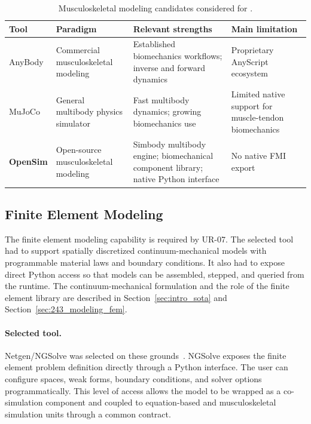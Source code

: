 \begin{table}[htbp]
  \centering
  \small
  \caption[Musculoskeletal modeling candidates]{Musculoskeletal modeling candidates considered for \syssimx{}.}
  \label{tab:musc_tool_comparison}
  \begin{tabular}{p{2.5cm} p{3.0cm} p{4.5cm} p{4.0cm}}
    \toprule
    \textbf{Tool}    & \textbf{Paradigm}                    & \textbf{Relevant strengths}                                                        & \textbf{Main limitation}                              \\
    \midrule
    AnyBody          & Commercial musculoskeletal modeling  & Established biomechanics workflows; inverse and forward dynamics                   & Proprietary AnyScript ecosystem                       \\
    \addlinespace
    MuJoCo           & General multibody physics simulator  & Fast multibody dynamics; growing biomechanics use                                  & Limited native support for muscle-tendon biomechanics \\
    \addlinespace
    \textbf{OpenSim} & Open-source musculoskeletal modeling & Simbody multibody engine; biomechanical component library; native Python interface & No native \ac{FMI} export                                  \\
    \bottomrule
  \end{tabular}
\end{table}

\subsection{Finite Element Modeling}
\label{sec:tool_fem}

The finite element modeling capability is required by UR-07.
The selected tool had to support spatially discretized continuum-mechanical models with programmable material laws and boundary conditions.
It also had to expose direct Python access so that models can be assembled, stepped, and queried from the \syssimx{} runtime.
The continuum-mechanical formulation and the role of the finite element library are described in Section~\ref{sec:intro_sota} and Section~\ref{sec:243_modeling_fem}.

\paragraph{Selected tool.}
Netgen/NGSolve was selected on these grounds~\cite{schoberl_c11_2014,schoberl_netgen_1997}.
NGSolve exposes the finite element problem definition directly through a Python interface.
The user can configure spaces, weak forms, boundary conditions, and solver options programmatically.
This level of access allows the model to be wrapped as a co-simulation component and coupled to equation-based and musculoskeletal simulation units through a common contract.

